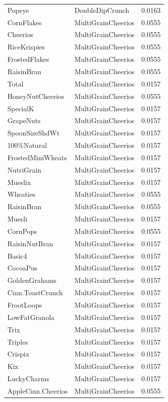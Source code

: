\begin{table}[!htbp]
\begin{tabular}{lll}
Popeye & DoubleDipCrunch & 0.0163
\\
CornFlakes & MultiGrainCheerios & 0.0555
\\
Cheerios & MultiGrainCheerios & 0.0555
\\
RiceKrispies & MultiGrainCheerios & 0.0555
\\
FrostedFlakes & MultiGrainCheerios & 0.0555
\\
RaisinBran & MultiGrainCheerios & 0.0555
\\
Total & MultiGrainCheerios & 0.0157
\\
HoneyNutCheerios & MultiGrainCheerios & 0.0555
\\
SpecialK & MultiGrainCheerios & 0.0157
\\
GrapeNuts & MultiGrainCheerios & 0.0157
\\
SpoonSizeShdWt & MultiGrainCheerios & 0.0157
\\
100\%Natural & MultiGrainCheerios & 0.0157
\\
FrostedMiniWheats & MultiGrainCheerios & 0.0157
\\
NutriGrain & MultiGrainCheerios & 0.0157
\\
Mueslix & MultiGrainCheerios & 0.0157
\\
Wheaties & MultiGrainCheerios & 0.0555
\\
RaisinBran & MultiGrainCheerios & 0.0555
\\
Muesli & MultiGrainCheerios & 0.0157
\\
CornPops & MultiGrainCheerios & 0.0555
\\
RaisinNutBran & MultiGrainCheerios & 0.0157
\\
Basic4 & MultiGrainCheerios & 0.0157
\\
CocoaPus & MultiGrainCheerios & 0.0157
\\
GoldenGrahams & MultiGrainCheerios & 0.0157
\\
Cinn.ToastCrunch & MultiGrainCheerios & 0.0157
\\
FrootLoops & MultiGrainCheerios & 0.0157
\\
LowFatGranola & MultiGrainCheerios & 0.0157
\\
Trix & MultiGrainCheerios & 0.0157
\\
Triples & MultiGrainCheerios & 0.0157
\\
Crispix & MultiGrainCheerios & 0.0157
\\
Kix & MultiGrainCheerios & 0.0157
\\
LuckyCharms & MultiGrainCheerios & 0.0157
\\
AppleCinn.Cheerios & MultiGrainCheerios & 0.0555

\end{tabular}
\end{table}
